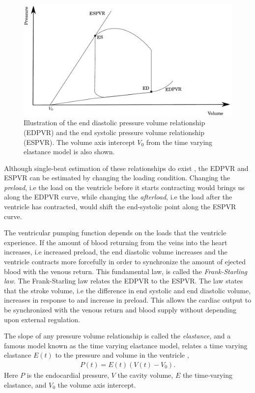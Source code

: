 \begin{figure}[htbp]
  \centering
    \includegraphics[width=\textwidth]{chapters/introduction/figures/pvr.pdf}
\caption{Illustration of the end diastolic pressure volume
  relationship (EDPVR) and the end systolic pressure volume
  relationship (ESPVR). The volume axis intercept $V_0$ from the time
  varying elastance model is also shown. }
\label{fig:intro_pvr}
\end{figure}




Although single-beat estimation of these relationships do
exist \cite{senzaki1996single,klotz2006single}, the EDPVR and ESPVR
can be estimated by changing the loading condition.
Changing the \emph{preload}, i.e the load on the ventricle
before it starts contracting would brings us along the EDPVR
curve, while changing the \emph{afterload}, i.e the load after
the ventricle has contracted, would shift the end-systolic point along
the ESPVR curve.


The ventricular pumping function depends on the loads that the
ventricle experience. If the amount of blood returning from the veins
into the heart increases, i.e increased preload, the end diastolic
volume increases and the ventricle contracts more forcefully in order
to synchronize the amount of ejected blood with the venous
return. This fundamental law, is called the \emph{Frank-Starling
  law}. The Frank-Starling law relates the EDPVR to the ESPVR. The law
states that the stroke volume, i.e the difference in end systolic and
end diastolic volume, increases in response to and increase in
preload. This allows the cardiac output to
be synchronized with the venous return and blood supply without
depending upon external regulation. 


The slope of any pressure volume relationship is called the \emph{elastance},
and a famous model known as the  time varying elastance model, relates
a time varying elastance $E(t)$ to the pressure and volume in the ventricle
\cite{sagawa1977end},  
\begin{align}
  P(t) = E(t)( V(t) - V_0 ).
  \label{eq:time_varying_elastance}
\end{align}
Here $P$ is the endocardial pressure, $V$ the cavity volume, $E$ the
time-varying elastance, and $V_0$ the volume axis intercept.

